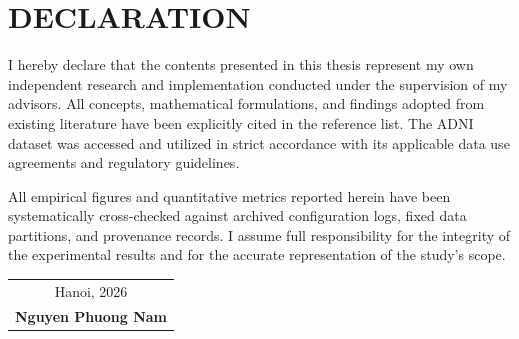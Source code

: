 \chapter*{DECLARATION}

I hereby declare that the contents presented in this thesis represent my own independent research and implementation conducted under the supervision of my advisors. All concepts, mathematical formulations, and findings adopted from existing literature have been explicitly cited in the reference list. The ADNI dataset was accessed and utilized in strict accordance with its applicable data use agreements and regulatory guidelines.

All empirical figures and quantitative metrics reported herein have been systematically cross-checked against archived configuration logs, fixed data partitions, and provenance records. I assume full responsibility for the integrity of the experimental results and for the accurate representation of the study's scope.

\vspace{1.5cm}
\begin{flushright}
\begin{tabular}{@{}c@{}}
Hanoi, 2026\\[1.5cm]
\textbf{Nguyen Phuong Nam}
\end{tabular}
\end{flushright}

